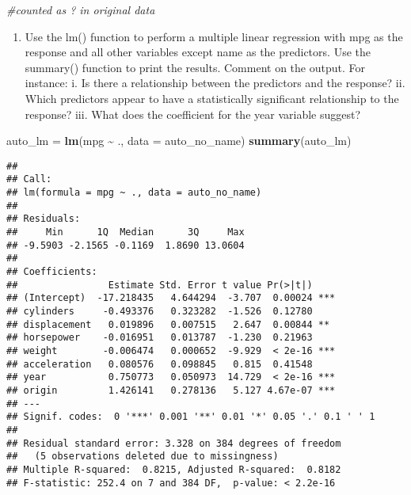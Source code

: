 \documentclass[
]{article}
\newenvironment{Shaded}{\begin{snugshade}}{\end{snugshade}}
\newcommand{\AttributeTok}[1]{\textcolor[rgb]{0.13,0.29,0.53}{#1}}
\newcommand{\CommentTok}[1]{\textcolor[rgb]{0.56,0.35,0.01}{\textit{#1}}}
\newcommand{\FunctionTok}[1]{\textcolor[rgb]{0.13,0.29,0.53}{\textbf{#1}}}
\newcommand{\NormalTok}[1]{#1}
\newcommand{\OtherTok}[1]{\textcolor[rgb]{0.56,0.35,0.01}{#1}}
\newcommand{\SpecialCharTok}[1]{\textcolor[rgb]{0.81,0.36,0.00}{\textbf{#1}}}
\providecommand{\tightlist}{%
  \setlength{\itemsep}{0pt}\setlength{\parskip}{0pt}}
\begin{document}
\begin{Shaded}
\begin{Highlighting}[]
\CommentTok{\#counted as ? in original data}
\end{Highlighting}
\end{Shaded}

\begin{enumerate}
\def\labelenumi{(\alph{enumi})}
\setcounter{enumi}{2}
\tightlist
\item
  Use the lm() function to perform a multiple linear regression with mpg
  as the response and all other variables except name as the predictors.
  Use the summary() function to print the results. Comment on the
  output. For instance: i. Is there a relationship between the
  predictors and the response? ii. Which predictors appear to have a
  statistically significant relationship to the response? iii. What does
  the coefficient for the year variable suggest?
\end{enumerate}

\begin{Shaded}
\begin{Highlighting}[]
\NormalTok{auto\_lm }\OtherTok{=} \FunctionTok{lm}\NormalTok{(mpg }\SpecialCharTok{\textasciitilde{}}\NormalTok{ ., }\AttributeTok{data =}\NormalTok{ auto\_no\_name)}
\FunctionTok{summary}\NormalTok{(auto\_lm)}
\end{Highlighting}
\end{Shaded}

\begin{verbatim}
## 
## Call:
## lm(formula = mpg ~ ., data = auto_no_name)
## 
## Residuals:
##     Min      1Q  Median      3Q     Max 
## -9.5903 -2.1565 -0.1169  1.8690 13.0604 
## 
## Coefficients:
##                Estimate Std. Error t value Pr(>|t|)    
## (Intercept)  -17.218435   4.644294  -3.707  0.00024 ***
## cylinders     -0.493376   0.323282  -1.526  0.12780    
## displacement   0.019896   0.007515   2.647  0.00844 ** 
## horsepower    -0.016951   0.013787  -1.230  0.21963    
## weight        -0.006474   0.000652  -9.929  < 2e-16 ***
## acceleration   0.080576   0.098845   0.815  0.41548    
## year           0.750773   0.050973  14.729  < 2e-16 ***
## origin         1.426141   0.278136   5.127 4.67e-07 ***
## ---
## Signif. codes:  0 '***' 0.001 '**' 0.01 '*' 0.05 '.' 0.1 ' ' 1
## 
## Residual standard error: 3.328 on 384 degrees of freedom
##   (5 observations deleted due to missingness)
## Multiple R-squared:  0.8215, Adjusted R-squared:  0.8182 
## F-statistic: 252.4 on 7 and 384 DF,  p-value: < 2.2e-16
\end{verbatim}
\end{document}
